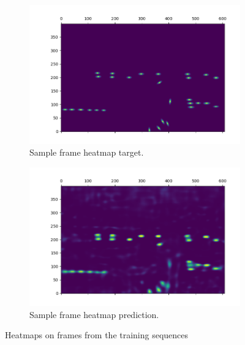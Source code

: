 \documentclass[letter]{article}
\begin{document}
	\begin{figure}[h]
		\begin{subfigure}[t]{0.49\textwidth}
			\centering
			\includegraphics[scale=0.4]{images/aniso_target.png}
			\caption{Sample frame heatmap target.}
		\end{subfigure}
		\begin{subfigure}[t]{0.49\textwidth}
			\centering
			\includegraphics[scale=0.4]{images/aniso_pred.png}
			\caption{Sample frame heatmap prediction.}
		\end{subfigure}
		\vspace*{1mm}
		\caption{Heatmaps on frames from the training sequences}
		\label{fig:aniso}
	\end{figure}
\end{document}
